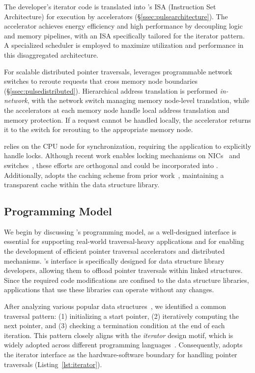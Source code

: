 The developer's iterator code is translated into \pulse's ISA (Instruction Set Architecture) for execution by \pulse accelerators (\S\ref{ssec:pulsearchitecture}). The accelerator achieves energy efficiency and high performance by decoupling logic and memory pipelines, with an ISA specifically tailored for the iterator pattern. A specialized scheduler is employed to maximize utilization and performance in this disaggregated architecture.

For scalable distributed pointer traversals, \pulse leverages programmable network switches to reroute requests that cross memory node boundaries (\S\ref{ssec:pulsedistributed}). Hierarchical address translation is performed \emph{in-network}, with the network switch managing memory node-level translation, while the accelerators at each memory node handle local address translation and memory protection. If a request cannot be handled locally, the accelerator returns it to the switch for rerouting to the appropriate memory node.

 \pulse relies on the CPU node for synchronization, requiring the application to explicitly handle locks. Although recent work enables locking mechanisms on NICs~\cite{sherman, clover} and switches~\cite{netlock}, these efforts are orthogonal and could be incorporated into \pulse. Additionally, \pulse adopts the caching scheme from prior work~\cite{aifm}, maintaining a transparent cache within the data structure library.



\subsection{\pulse Programming Model}
\label{ssec:pulseinterface}
We begin by discussing \pulse's programming model, as a well-designed interface is essential for supporting real-world traversal-heavy applications and for enabling the development of efficient pointer traversal accelerators and distributed mechanisms. \pulse's interface is specifically designed for data structure library developers, allowing them to offload pointer traversals within linked structures. Since the required code modifications are confined to the data structure libraries, applications that use these libraries can operate without any changes.

After analyzing various popular data structures~\cite{stl, boost, javaiterator, c++iterator}, we identified a common traversal pattern: (1) initializing a start pointer, (2) iteratively computing the next pointer, and (3) checking a termination condition at the end of each iteration. This pattern closely aligns with the \emph{iterator} design motif, which is widely adopted across different programming languages~\cite{javaiterator}. Consequently, \pulse adopts the iterator interface as the hardware-software boundary for handling pointer traversals (Listing~\ref{lst:iterator}).

